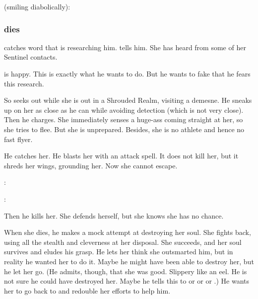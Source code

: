 \begin{garbage}
\begin{prose}
  \Ishnaruchaefir{} (smiling diabolically): 
\end{prose}






\subsubsection{\Urizeth{} dies}
\Ishnaruchaefir{} catches word that \Teshrial{} is researching him. 
\Criseis{} tells him. 
She has heard from some of her Sentinel contacts. 

\Ishnaruchaefir{} is happy. 
This is exactly what he wants \Teshrial{} to do. 
But he wants to fake that he fears this research. 

So \Ishnaruchaefir{} seeks out \Urizeth{} while she is out in a Shrouded Realm, visiting a demesne. 
He sneaks up on her as close as he can while avoiding detection (which is not very close). 
Then he charges. 
She immediately senses a huge-ass \vertex{} coming straight at her, so she tries to flee. 
But she is unprepared. 
Besides, she is no athlete and hence no fast flyer. 

He catches her. 
He blasts her with an attack spell. 
It does not kill her, but it shreds her wings, grounding her. 
Now she cannot escape. 

\begin{prose}
  \Urizeth: 

  \Ishnaruchaefir: 
\end{prose}

Then he kills her. 
She defends herself, but she knows she has no chance. 

When she dies, he makes a mock attempt at destroying her soul. 
She fights back, using all the \TiphredSerah{} stealth and cleverness at her disposal. 
She succeeds, and her soul survives and eludes his grasp.
He lets her think she outsmarted him, but in reality he wanted her to do it. 
Maybe he might have been able to destroy her, but he let her go. 
(He admits, though, that she was good. Slippery like an eel. He is not sure he could have destroyed her. Maybe he tells this to \Secherdamon{} or \Nzessuacrith{} or \Menessiaraid{} or \Criseis.) 
He wants her to go back to \Teshrial{} and redouble her efforts to help him. 


\end{garbage}
